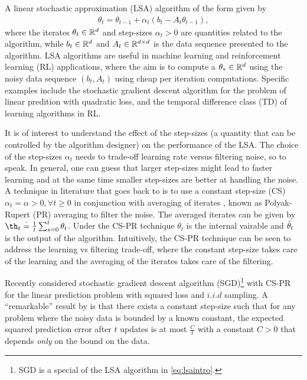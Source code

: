 A linear stochastic approximation (LSA) algorithm of the form given by
\begin{align}\label{eq:lsaintro}
\theta_t=\theta_{t-1}+\alpha_t (b_t-A_t \theta_{t-1}),
\end{align}
where the iterates $\theta_t\in \mathbb{R}^d$ and step-sizes $\alpha_t>0$ are quantities related to the algorithm, while $b_t\in \mathbb{R}^d$ and $A_t\in \mathbb{R}^{d \times d}$ is the data sequence presented to the algorithm.
LSA algorithms are useful in machine learning and reinforcement learning (RL) applications, where the aim is to compute a $\theta_*\in \mathbb{R}^d$ using the noisy data sequence $(b_t,A_t)$ using cheap per iteration computations. Specific examples include the stochastic gradient descent algorithm for the problem of linear predition with quadratic loss, and the temporal difference class (TD) of learning algorithms in RL.\par
It is of interest to understand the effect of the step-sizes (a quantity that can be controlled by the algorithm designer) on the performance of the LSA. The choice of the step-sizes $\alpha_t$ needs to trade-off learning rate versus filtering noise, so to speak. In general, one can guess that larger step-sizes might lead to faster learning and at the same time smaller step-sizes are better at handling the noise. A technique in literature that goes back to \cite{polyak,ruppert} is to use a constant step-size (CS) $\alpha_t=\alpha>0,\forall t\geq 0$  in conjunction with averaging of iterates , known as Polyak-Rupert (PR) averaging to filter the noise. The averaged iterates can be given by $\th_t\eqdef\frac{1}{t}\sum_{s=0}^t \theta_t$. Under the CS-PR technique $\theta_t$ is the internal vairable and $\hat{\theta}_t$ is the output of the algorithm. Intuitively, the CS-PR technique can be seen to address the learning vs filtering trade-off, where the constant step-size takes care of the learning  and the averaging of the iterates takes care of the filtering. \par
Recently \cite{bach} considered stochastic gradient descent algorithm (SGD)\footnote{SGD is a special of the LSA algorithm in \eqref{eq:lsaintro}.} with CS-PR for the linear prediction problem with squared loss and $i.i.d$ sampling. A ``remarkable'' result by \cite{bach} is that there exists a constant step-size such that for any problem where the noisy data is bounded by a known constant, the expected squared prediction error after $t$ updates is at most $\frac{C}{t}$ with a constant $C>0$ that depends \emph{only} on the bound on the data.
